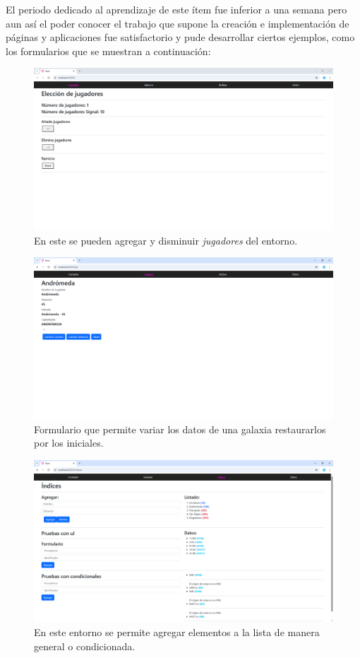 El periodo dedicado al aprendizaje de este ítem fue inferior a una semana pero aun así el poder conocer el trabajo que supone la creación e implementación de páginas y aplicaciones fue satisfactorio y pude desarrollar ciertos ejemplos, como los formularios que se muestran a continuación:

\begin{figure}[H]
    \centering
    \includegraphics[width=0.8\linewidth]{figuras/pag1.png}
    \caption[Formulario web: Página 1]{En este se pueden agregar y disminuir \textit{jugadores} del entorno.}
    \label{pag1}
\end{figure}
\begin{figure}[H]
     \centering
    \includegraphics[width=0.8\linewidth]{figuras/pag2.png}
    \caption[Formulario web: Página 2]{Formulario que permite variar los datos de una galaxia restaurarlos por los iniciales.}
    \label{pag2}
\end{figure}
\begin{figure}[H]
\centering
    \includegraphics[width=0.8\linewidth]{figuras/pag3.png}
    \caption[Formulario web: Página 3]{En este entorno se permite agregar elementos a la lista de manera general o condicionada.}
    \label{pag3}
\end{figure}
